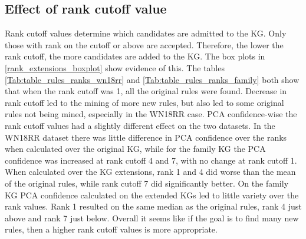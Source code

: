 \fi




\newpage
\subsection{Effect of rank cutoff value}
Rank cutoff values determine which candidates are admitted to the KG. Only those with rank on the cutoff or above are accepted. Therefore, the lower the rank cutoff, the more candidates are added to the KG. The box plots in \cref{rank_extensions_boxplot} show evidence of this. The tables \ref{Tab:table_rules_ranks_wn18rr} and \ref{Tab:table_rules_ranks_family} both show that when the rank cutoff was 1, all the original rules were found. Decrease in rank cutoff led to the mining of more new rules, but  also led to some original rules not being mined, especially in the WN18RR case. PCA confidence-wise the rank cutoff values had a slightly different effect on the two datasets. In the WN18RR dataset there was little difference in PCA confidence over the ranks when calculated over the original KG, while for the family KG the PCA confidence was increased at rank cutoff 4 and 7, with no change at rank cutoff 1. When calculated over the KG extensions, rank 1 and 4 did worse than the mean of the original rules, while rank cutoff 7 did significantly better. On the family KG PCA confidence calculated on the extended KGs led to little variety over the rank values. Rank 1 resulted on the same median as the original rules, rank 4 just above and rank 7 just below. Overall it seems like if the goal is to find many new rules, then a higher rank cutoff values is more appropriate.

